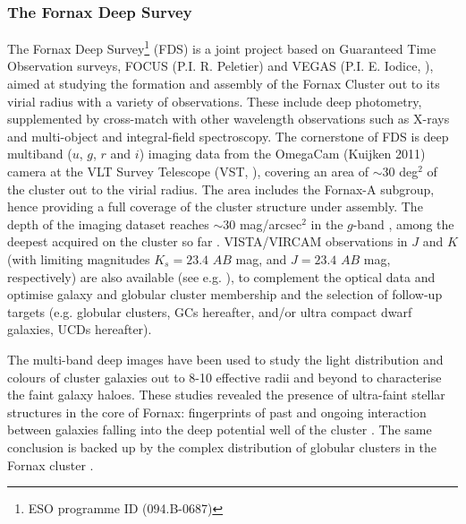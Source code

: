 \documentclass[usenatbib]{mnras}
\begin{document}
\subsubsection{The Fornax Deep Survey}
\label{sec:FDS}

The Fornax Deep Survey\footnote{ESO programme ID (094.B-0687)} (FDS) is a joint
project based on Guaranteed Time Observation surveys, FOCUS (P.I. R. Peletier)
and VEGAS (P.I. E. Iodice, \citealt{capaccioli15}), aimed at studying the
formation and assembly of the Fornax Cluster out to its virial radius with a
variety of observations. These include
deep photometry, supplemented by cross-match with other wavelength observations
such as  X-rays \citep[][e.g.,]{Paolillo02} and multi-object and integral-field
spectroscopy.
The cornerstone of FDS is deep multiband ($u$, $g$, $r$ and $i$) imaging data
from the OmegaCam (Kuijken 2011) camera at the VLT Survey Telescope (VST,
\citealt{schipani12}), covering an area of $\sim30$ deg$^2$ of the cluster out
to the virial radius. The area includes the Fornax-A subgroup, hence providing
a full coverage of the cluster structure under assembly.  The depth of the
imaging dataset reaches $\sim 30$ mag/arcsec$^2$ in the $g$-band \citep{Iodice16, Iodice17},
among the deepest acquired on the cluster so far \citep{venhola17}.
VISTA/VIRCAM observations in $J$ and $K$ (with limiting magnitudes $K_s  = 23.4 $ $AB$
mag, and $J = 23.4$ $AB$ mag, respectively) are also available (see e.g. \citealt{munoz15}), to
complement the optical data and optimise galaxy and globular cluster membership
and the selection of follow-up targets (e.g. globular clusters, GCs hereafter,
and/or ultra compact dwarf galaxies, UCDs hereafter).

The multi-band deep images have been used to study the light distribution and
colours of cluster galaxies out to 8-10 effective radii and beyond to
characterise the faint galaxy haloes. These studies revealed the presence of
ultra-faint stellar structures in the core of Fornax: fingerprints of past and
ongoing interaction between galaxies falling into the deep potential well of
the cluster \citep{Iodice16,venhola17}. The same conclusion is
backed up by the complex distribution of globular clusters in the Fornax
cluster \citep{DAbrusco16,cantiello17}.
\end{document}
